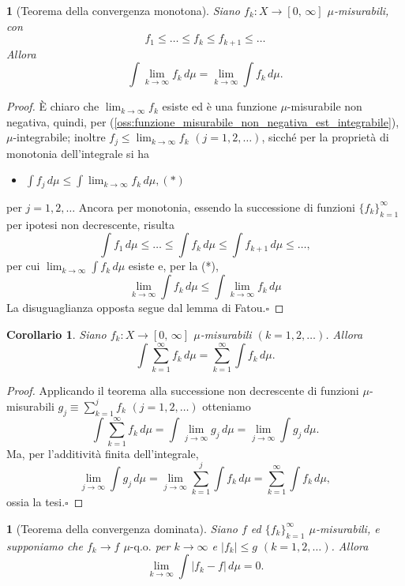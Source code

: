 \documentclass[a4paper,10pt,openright,oneside]{book}
\theoremstyle{theoremstyle}
\newtheorem{corollario}[teorema]{Corollario}
\theoremstyle{theoremstylewoheader}
\newtheorem{teorema2}[teorema]{}
\theoremstyle{theoremstyle}
\theoremstyle{proofsecstyle}
\theoremstyle{nonumberplain}
\newtheorem{proof}{Dim.}
\newcommand{\abs}[1]{\ensuremath{\lvert #1 \rvert}}
\newcommand{\qo}[1]{\ensuremath{#1\text{-q.o.}}}
\renewcommand{\qedsymbol}{\ensuremath{\square}}
\newcommand{\qed}{\unskip\nobreak\hfill\nobreak\hspace{.5em}\qedsymbol}
\newcommand{\mymath}[2]{\begin{itemize}%
  \item[]\hfill\hbox{}\ensuremath{\displaystyle #1}\hfill\ensuremath{\displaystyle #2}%
  \end{itemize}}
\begin{document}
\begin{teorema2}[Teorema della convergenza monotona]
\label{thm:convergenza_monotona}
Siano $f_k : X \rightarrow [0,\, \infty]$ $\mu$-misurabili, con
\[
f_1 \le \ldots \le f_k \le f_{k+1} \le \ldots
\]
Allora
\[
\int \lim_{k \to \infty} f_k\, d\mu = \lim_{k \to \infty} \int f_k\, d\mu.
\]
\end{teorema2}

\begin{proof}
\`E chiaro che $\lim_{k \to \infty} f_k$ esiste ed è una funzione $\mu$-misurabile non negativa, quindi, per (\ref{oss:funzione_misurabile_non_negativa_est_integrabile}), $\mu$-integrabile; inoltre $f_j \le \lim_{k \to \infty} f_k$ $(j = 1, 2, \ldots)$, sicché per la proprietà di monotonia dell'integrale si ha \mymath{\int f_j\, d\mu \le \int \lim_{k \to \infty} f_k\, d\mu,}{(*)} per $j = 1, 2, \ldots$ Ancora per monotonia, essendo la successione di funzioni $\{f_k\}_{k=1}^\infty$ per ipotesi non decrescente, risulta 
\[
\int f_1\, d\mu \le \ldots \le \int f_k\, d\mu \le \int f_{k+1}\, d\mu \le \ldots,
\]
per cui $\lim_{k \to \infty} \int f_k\, d\mu$ esiste e, per la (*),
\[
\lim_{k \to \infty} \int f_k\, d\mu \le \int \lim_{k \to \infty} f_k\, d\mu
\]
La disuguaglianza opposta segue dal lemma di Fatou.\qed
\end{proof}

\begin{corollario}
\label{cor:convergenza_monotona}
Siano $f_k : X \rightarrow [0,\, \infty]$ $\mu$-misurabili $(k = 1, 2, \ldots)$. Allora
\[
\int \sum_{k=1}^\infty f_k\, d\mu = \sum_{k=1}^\infty \int f_k\, d\mu.
\]
\end{corollario}

\begin{proof}
Applicando il teorema alla successione non decrescente di funzioni $\mu$-misurabili $g_j \equiv \sum_{k=1}^j f_k$ $(j = 1, 2, \ldots)$ otteniamo
\[
\int \sum_{k=1}^\infty f_k\, d\mu = \int \lim_{j \to \infty} g_j\, d\mu = \lim_{j \to \infty} \int g_j\, d\mu.
\]
Ma, per l'additività finita dell'integrale,
\[
\lim_{j \to \infty} \int g_j\, d\mu = \lim_{j \to \infty} \sum_{k=1}^j \int f_k\, d\mu = \sum_{k=1}^\infty \int f_k\, d\mu,
\]
ossia la tesi.\qed
\end{proof}

\begin{teorema2}[Teorema della convergenza dominata]
\label{thm:convergenza_dominata}
Siano $f$ ed $\{f_k\}_{k=1}^\infty$ $\mu$-misurabili, e supponiamo che $f_k \to f$ $\qo{\mu}$ per $k \to \infty$ e $\abs{f_k} \le g$ $(k = 1, 2, \ldots)$. Allora
\[
\lim_{k \to \infty} \int \abs{f_k - f}\, d\mu = 0.
\]
\end{teorema2}
\end{document}
